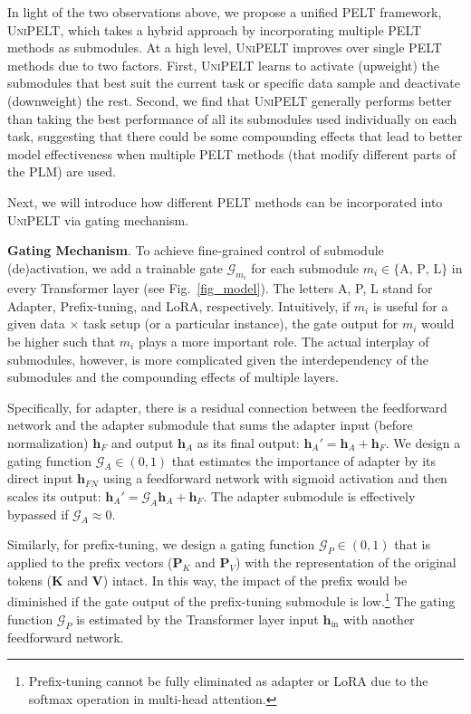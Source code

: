 In light of the two observations above, we propose a unified PELT framework, \textsc{UniPELT}, which takes a hybrid approach by incorporating multiple PELT methods as submodules. At a high level, \textsc{UniPELT} improves over single PELT methods due to two factors. First, \textsc{UniPELT} learns to activate (upweight) the submodules that best suit the current task or specific data sample and deactivate (downweight) the rest. Second, we find that \textsc{UniPELT} generally performs better than taking the best performance of all its submodules used individually on each task, suggesting that there could be some compounding effects that lead to better model effectiveness when multiple PELT methods (that modify different parts of the PLM) are used.

Next, we will introduce how different PELT methods can be incorporated into \textsc{UniPELT} via gating mechanism.

{{\bf Gating Mechanism}.} To achieve fine-grained control of submodule (de)activation, we add a trainable gate ${\mathcal{G}}_{m_i}$ for each submodule $m_i \in \{\text{A, P, L}\}$ in every Transformer layer (see Fig.~\ref{fig_model}).
The letters A, P, L stand for Adapter, Prefix-tuning, and LoRA, respectively. Intuitively, if $m_i$ is useful for a given data $\times$ task setup (or a particular instance), the gate output for $m_i$ would be higher such that $m_i$ plays a more important role. The actual interplay of submodules, however, is more complicated given the interdependency of the submodules and the compounding effects of multiple layers. 

Specifically, for adapter, there is a residual connection between the feedforward network and the adapter submodule that sums the adapter input (before normalization) ${\bm{h}}_{F}$ and output ${\bm{h}}_A$ as its final output: ${\bm{h}}_A' = {\bm{h}}_A + {\bm{h}}_{F}$.
We design a gating function ${\mathcal{G}}_A \in (0, 1)$ that estimates the importance of adapter by its direct input ${\bm{h}}_{FN}$ using a feedforward network with sigmoid activation and then scales its output: ${\bm{h}}_A' = {\mathcal{G}}_A {\bm{h}}_A + {\bm{h}}_{F}$.
The adapter submodule is effectively bypassed if ${\mathcal{G}}_A \approx 0$.

Similarly, for prefix-tuning, we design a gating function ${\mathcal{G}}_P \in (0, 1)$ that is applied to the prefix vectors (${\bm{P}}_K$ and ${\bm{P}}_V$) with the representation of the original tokens (${\bm{K}}$ and ${\bm{V}}$) intact. In this way, the impact of the prefix would be diminished if the gate output of the prefix-tuning submodule is low.\footnote{Prefix-tuning cannot be fully eliminated as adapter or LoRA due to the softmax operation in multi-head attention.} The gating function ${\mathcal{G}}_P$ is estimated by the Transformer layer input ${\bm{h}}_{\text{in}}$ with another feedforward network. 

